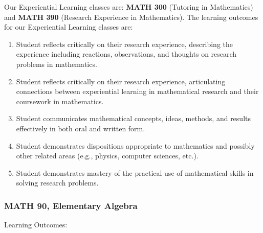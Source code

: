 \documentclass[11pt]{article}
\newenvironment{alphalist}{
\begin{enumerate}[label=(\arabic*),widest=107 ,leftmargin=25pt, itemsep=0pt]}
{\end{enumerate}}
\begin{document}
Our Experiential Learning classes are: \textbf{MATH 300} 
(Tutoring in Mathematics) and \textbf{MATH 390} (Research Experience in Mathematics).
The learning outcomes for our Experiential Learning classes are:
\begin{alphalist}
    \item  Student reflects critically on their research experience, describing the experience including reactions, observations, and thoughts on research problems in mathematics.
\item Student reflects critically on their research experience, articulating connections between experiential learning in mathematical research and their coursework in mathematics.
\item Student communicates mathematical concepts, ideas, methods, and results effectively in both oral and written form. 
\item Student demonstrates dispositions appropriate to mathematics and possibly other related areas (e.g., physics, computer sciences, etc.).
\item Student demonstrates mastery of the practical use of mathematical skills in solving research problems.
\end{alphalist}

\subsubsection*{MATH 90, Elementary Algebra}

Learning Outcomes:
\end{document}
